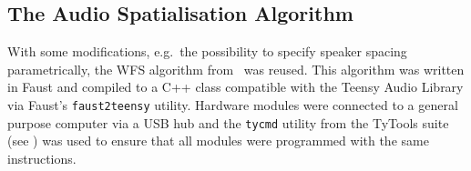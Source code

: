 %

\subsection{The Audio Spatialisation Algorithm}\label{subsec:wfs-algorithm}

With some modifications, e.g.\ the possibility to specify speaker spacing
parametrically, the WFS algorithm
from~\citep{rushton_microcontroller-based_2023} was reused.
This algorithm was written in Faust and compiled to
a C++ class compatible with the Teensy Audio Library via Faust's
\texttt{faust2teensy} utility.
Hardware modules were connected to a general purpose computer via a USB hub
and the \texttt{tycmd} utility from the TyTools suite (see
) was used to ensure that all modules were
programmed with the same instructions.

